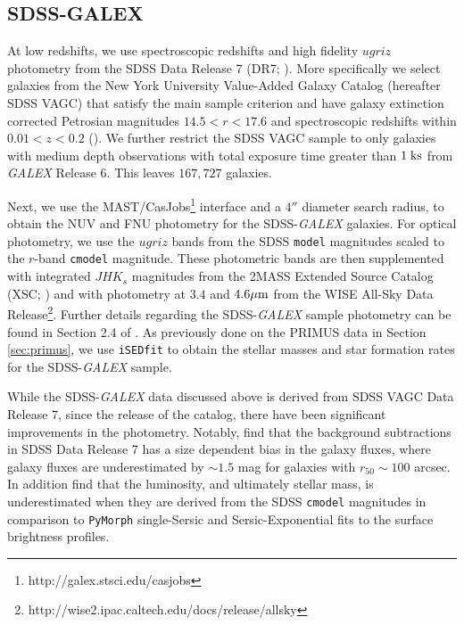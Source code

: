 \documentclass{emulateapj}
\begin{document}
\subsection{SDSS-GALEX} \label{sec:sdss}
At low redshifts, we use spectroscopic redshifts and high fidelity $ugriz$ photometry from the SDSS Data Release 7 (DR7; \cite{Abazajian:2009aa}). More specifically we select galaxies from the New York University Value-Added Galaxy Catalog (hereafter SDSS VAGC) that satisfy the main sample criterion and have galaxy extinction corrected Petrosian magnitudes $14.5 < r < 17.6$ and spectroscopic redshifts within $0.01 < z < 0.2$ (\cite{Blanton:2005aa}). We further restrict the SDSS VAGC sample to only galaxies with medium depth observations with total exposure time greater than $1 \; \rm{ks}$ from {\em GALEX} Release 6. This leaves $167,727$ galaxies. 

Next, we use the MAST/CasJobs\footnote{http://galex.stsci.edu/casjobs} interface and a $4''$ diameter search radius, to obtain the NUV and FNU photometry for the SDSS-{\em GALEX} galaxies. For optical photometry, we use the $ugriz$ bands from the SDSS \texttt{model} magnitudes scaled to the $r$-band \texttt{cmodel} magnitude. These photometric bands are then supplemented with integrated $JHK_s$ magnitudes from the 2MASS Extended Source Catalog (XSC; \cite{Jarrett:2000aa}) and with photometry at $3.4$ and $4.6 \mu \rm{m}$ from the WISE All-Sky Data Release\footnote{http://wise2.ipac.caltech.edu/docs/release/allsky}. Further details regarding the SDSS-{\em GALEX} sample photometry can be found in Section 2.4 of \cite{Moustakas:2013aa}. As previously done on the PRIMUS data in Section \ref{sec:primus}, we use \texttt{iSEDfit} to obtain the stellar masses and star formation rates for the SDSS-{\em GALEX} sample. 

While the SDSS-{\em GALEX} data discussed above is derived from SDSS VAGC Data Release 7, since the release of the catalog, there have been significant improvements in the photometry. Notably, \cite{Blanton:2011aa} find that the background subtractions in SDSS Data Release 7 has a size dependent bias in the galaxy fluxes, where galaxy fluxes are underestimated by $\sim 1.5$ mag for galaxies with $r_{50} \sim 100 $ arcsec. In addition \cite{Bernardi:2013aa} find that the luminosity, and ultimately stellar mass, is underestimated when they are derived from the SDSS \texttt{cmodel} magnitudes in comparison to \texttt{PyMorph} single-Sersic and Sersic-Exponential fits to the surface brightness profiles. 
\end{document}
